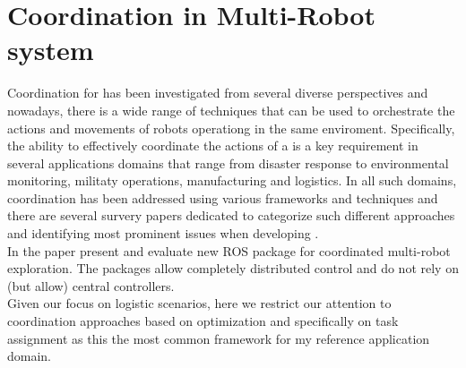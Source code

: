 \section{Coordination in Multi-Robot system}
Coordination for \mrs has been investigated from several diverse
perspectives and nowadays, there is a wide range of techniques that can be used to 
orchestrate the actions and movements of robots operationg in the same enviroment.
Specifically, the ability to effectively coordinate the actions of a \mrs is a key 
requirement in several applications domains that range from disaster response to 
environmental monitoring, militaty operations, manufacturing and logistics. 
In all such domains, coordination has been addressed using various frameworks and 
techniques and there are several survery papers dedicated to categorize such different
approaches and identifying most prominent issues when developing \mrs.
\\
In the paper \cite{cooros} present and evaluate new ROS package for coordinated 
multi-robot exploration. The packages allow completely distributed control and do 
not rely on (but allow) central controllers.
\\
Given our focus on logistic scenarios, here we restrict our attention to coordination
approaches based on optimization and specifically on task assignment as this the most 
common framework for my reference application domain.







